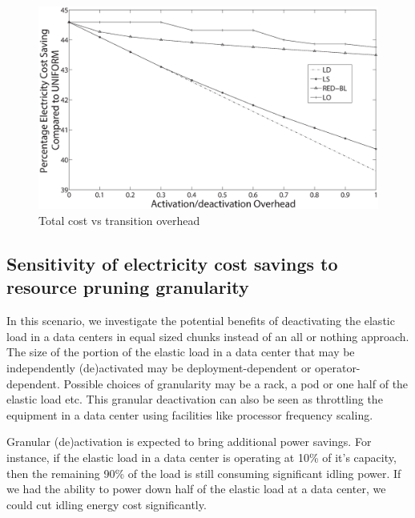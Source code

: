 \begin{figure}[htbp]
    \centering
    \includegraphics[width=1\linewidth]{pics/s3r.eps}
    \caption{Total cost vs transition overhead}
    \label{fig:s3r}
\end{figure}

\subsection{Sensitivity of electricity cost savings to resource pruning granularity}
In this scenario, we investigate the potential benefits of deactivating the elastic load in a data centers in equal sized chunks instead of an all or nothing approach. The size of the portion of the elastic load in a data center that may be independently (de)activated may be deployment-dependent or operator-dependent. Possible choices of granularity may be a rack, a pod or one half of the elastic load etc. This granular deactivation can also be seen as throttling the equipment in a data center using facilities like processor frequency scaling. 

Granular (de)activation is expected to bring additional power savings. For instance, if the elastic load in a data center is operating at 10\% of it's capacity, then the remaining 90\% of the load is still consuming significant idling power. If we had the ability to power down half of the elastic load at a data center, we could cut idling energy cost significantly. 

